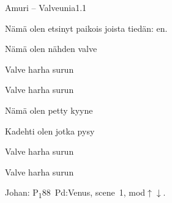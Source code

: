 \documentclass[12pt,a4paper]{article}
\begin{document}
\thispagestyle{empty}
\begin{mysong}{Amuri – Valveunia}{1.1}

\begin{SBVerse}
  Nämä  olen etsinyt  paikois joista
  tiedän:  en.

  Nämä  olen  nähden 
  valve
\end{SBVerse}

\begin{SBChorus}
  Valve harha surun 

  Valve harha surun 
\end{SBChorus}


\begin{SBVerse}
  Nämä  olen  petty
  kyyne

  Kadehti olen  jotka 
  pysy
\end{SBVerse}

\begin{SBChorus}
  Valve harha surun 

  Valve harha surun 
\end{SBChorus}


{\SBLyricNoteFont Johan: P\textsubscript{1}88~Pd:Venus, scene~1,
mod$\uparrow\downarrow$.}

\end{mysong}
\end{document}
